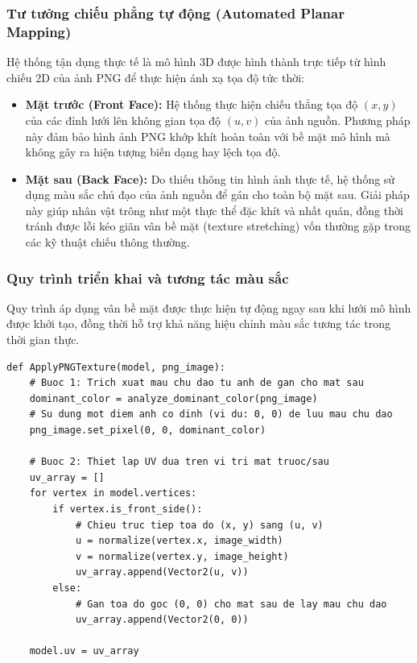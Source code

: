 \documentclass{report}
\newenvironment{graycode}
{\begin{mdframed}[backgroundcolor=light-gray, linecolor=light-gray, roundcorner=5pt]}
{\end{mdframed}}
\begin{document}
\subsubsection{Tư tưởng chiếu phẳng tự động (Automated Planar Mapping)}

Hệ thống tận dụng thực tế là mô hình 3D được hình thành trực tiếp từ hình chiếu 2D của ảnh PNG để thực hiện ánh xạ tọa độ tức thời:

\begin{itemize}
    \item \textbf{Mặt trước (Front Face):} Hệ thống thực hiện chiếu thẳng tọa độ $(x, y)$ của các đỉnh lưới lên không gian tọa độ $(u, v)$ của ảnh nguồn. Phương pháp này đảm bảo hình ảnh PNG khớp khít hoàn toàn với bề mặt mô hình mà không gây ra hiện tượng biến dạng hay lệch tọa độ.
    \item \textbf{Mặt sau (Back Face):} Do thiếu thông tin hình ảnh thực tế, hệ thống sử dụng màu sắc chủ đạo của ảnh nguồn để gán cho toàn bộ mặt sau. Giải pháp này giúp nhân vật trông như một thực thể đặc khít và nhất quán, đồng thời tránh được lỗi kéo giãn vân bề mặt (texture stretching) vốn thường gặp trong các kỹ thuật chiếu thông thường.
\end{itemize}

\subsubsection{Quy trình triển khai và tương tác màu sắc}

Quy trình áp dụng vân bề mặt được thực hiện tự động ngay sau khi lưới mô hình được khởi tạo, đồng thời hỗ trợ khả năng hiệu chỉnh màu sắc tương tác trong thời gian thực.

\begin{graycode}
\begin{lstlisting}[caption=Mã giả quy trình áp dụng Texture và UV]
def ApplyPNGTexture(model, png_image):
    # Buoc 1: Trich xuat mau chu dao tu anh de gan cho mat sau
    dominant_color = analyze_dominant_color(png_image)
    # Su dung mot diem anh co dinh (vi du: 0, 0) de luu mau chu dao
    png_image.set_pixel(0, 0, dominant_color)
    
    # Buoc 2: Thiet lap UV dua tren vi tri mat truoc/sau
    uv_array = []
    for vertex in model.vertices:
        if vertex.is_front_side():
            # Chieu truc tiep toa do (x, y) sang (u, v)
            u = normalize(vertex.x, image_width)
            v = normalize(vertex.y, image_height)
            uv_array.append(Vector2(u, v))
        else:
            # Gan toa do goc (0, 0) cho mat sau de lay mau chu dao
            uv_array.append(Vector2(0, 0))
            
    model.uv = uv_array
\end{lstlisting}
\end{graycode}
\end{document}
